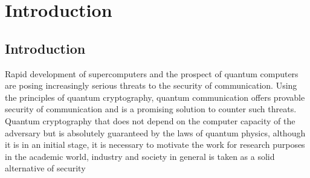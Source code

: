 \chapter{Introduction}
\label{chap:introduction}
\section{Introduction}
Rapid development of supercomputers and the prospect of quantum computers are posing increasingly serious threats to the security of communication. Using the principles of quantum cryptography, quantum communication offers provable security of communication and is a promising solution to counter such threats. Quantum cryptography that does not depend on the computer capacity of the adversary but is absolutely guaranteed by the laws of quantum physics, although it is in an initial stage, it is necessary to motivate the work for research purposes in the academic world, industry and society in general is taken as a solid alternative of security











